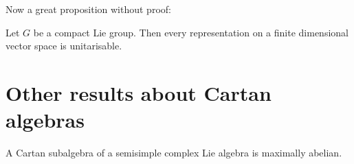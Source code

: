 Now a great proposition without proof:

\begin{proposition}
Let $G$ be a compact Lie group. Then every representation on a finite dimensional vector space is unitarisable.
\end{proposition}

\section{Other results about Cartan algebras}



\begin{lemma}
A Cartan subalgebra of a semisimple complex Lie algebra is maximally abelian.
\end{lemma}

